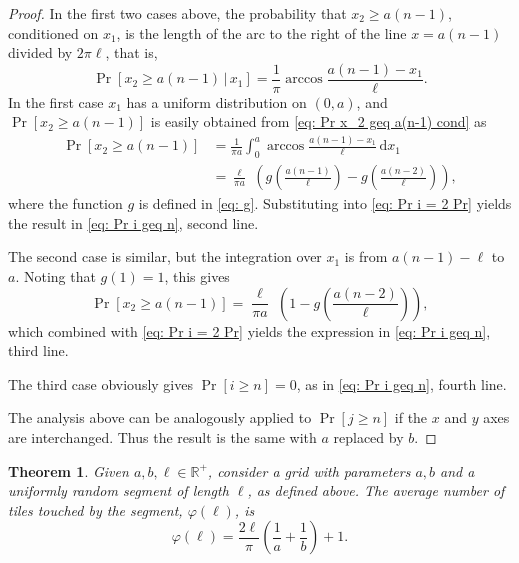 \documentclass[12pt, a4paper]{article}
\newcommand{\cond}{\,|\,} %
\newcommand{\diff}{\,\mathrm d}
\newcommand{\funta}{\varphi} %
\newcommand{\len}{\ell} %
\newtheorem{theorem}{Theorem}%
\begin{document}
\begin{proof}
In the first two cases above, the probability that $x_2 \geq a(n-1)$, conditioned on $x_1$, is the length of the arc to the right of the line $x=a(n-1)$ divided by $2\pi\len$, that is,
\begin{equation}
\label{eq: Pr x_2 geq a(n-1) cond}
\Pr[x_2 \geq a(n-1) \cond x_1] = \frac 1 \pi \arccos \frac{a(n-1)-x_1}{\len}.
\end{equation}
In the first case $x_1$ has a uniform distribution on $(0,a)$, and $\Pr[x_2 \geq a(n-1)]$ is easily obtained from \eqref{eq: Pr x_2 geq a(n-1) cond} as
\begin{equation}
\label{eq: Pr x_2 geq a(n-1), first case}
\begin{split}
\Pr[x_2 \geq a(n-1)] &= \frac 1 {\pi a} \int_0^a\arccos \frac{a(n-1)-x_1}{\len} \diff x_1 \\
&= \frac{\len}{\pi a}\,\, \left( g\left( \frac{a(n-1)}{\len} \right) - g\left( \frac{a(n-2)}{\len} \right) \right),
\end{split}
\end{equation}
where the function $g$ is defined in \eqref{eq: g}. Substituting into \eqref{eq: Pr i = 2 Pr} yields the result in \eqref{eq: Pr i geq n}, second line.

The second case is similar, but the integration over $x_1$ is from $a(n-1)-\len$ to $a$. Noting that $g(1)=1$, this gives
\begin{equation}
\label{eq: Pr x_2 geq a(n-1), second case}
\Pr[x_2 \geq a(n-1)] = \frac{\len}{\pi a}\,\, \left( 1 - g\left( \frac{a(n-2)}{\len} \right) \right),
\end{equation}
which combined with \eqref{eq: Pr i = 2 Pr} yields the expression in \eqref{eq: Pr i geq n}, third line.

The third case obviously gives $\Pr[i \geq n] = 0$, as in \eqref{eq: Pr i geq n}, fourth line.

The analysis above can be analogously applied to $\Pr[j \geq n]$ if the $x$ and $y$ axes are interchanged. Thus the result is the same with $a$ replaced by $b$.
\end{proof}

\begin{theorem}
\label{theo: funta, form}
Given $a, b, \len \in \mathbb R^+$, consider a grid with parameters $a, b$ and a uniformly random segment of length $\len$, as defined above. The average number of tiles touched by the segment, $\funta(\len)$, is 
\begin{equation}
\label{eq: funta, form}
\funta(\len) = \frac{2\len}{\pi}\left(\frac 1 a + \frac 1 b\right) + 1.
\end{equation}
\end{theorem}
\end{document}

